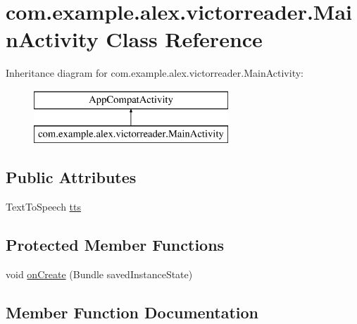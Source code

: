 \hypertarget{classcom_1_1example_1_1alex_1_1victorreader_1_1_main_activity}{}\section{com.\+example.\+alex.\+victorreader.\+Main\+Activity Class Reference}
\label{classcom_1_1example_1_1alex_1_1victorreader_1_1_main_activity}
Inheritance diagram for com.\+example.\+alex.\+victorreader.\+Main\+Activity\+:\begin{figure}[H]
\begin{center}
\leavevmode
\includegraphics[height=2.000000cm]{classcom_1_1example_1_1alex_1_1victorreader_1_1_main_activity}
\end{center}
\end{figure}
\subsection*{Public Attributes}
\begin{DoxyCompactItemize}
\item 
Text\+To\+Speech \hyperlink{classcom_1_1example_1_1alex_1_1victorreader_1_1_main_activity_a0ed6c05d6b216e7c01692c11ff660578}{tts}
\end{DoxyCompactItemize}
\subsection*{Protected Member Functions}
\begin{DoxyCompactItemize}
\item 
void \hyperlink{classcom_1_1example_1_1alex_1_1victorreader_1_1_main_activity_ad3ee93762ef61943471e7253eaa9a7be}{on\+Create} (Bundle saved\+Instance\+State)
\end{DoxyCompactItemize}


\subsection{Member Function Documentation}
\mbox{\label{classcom_1_1example_1_1alex_1_1victorreader_1_1_main_activity_ad3ee93762ef61943471e7253eaa9a7be}} 
